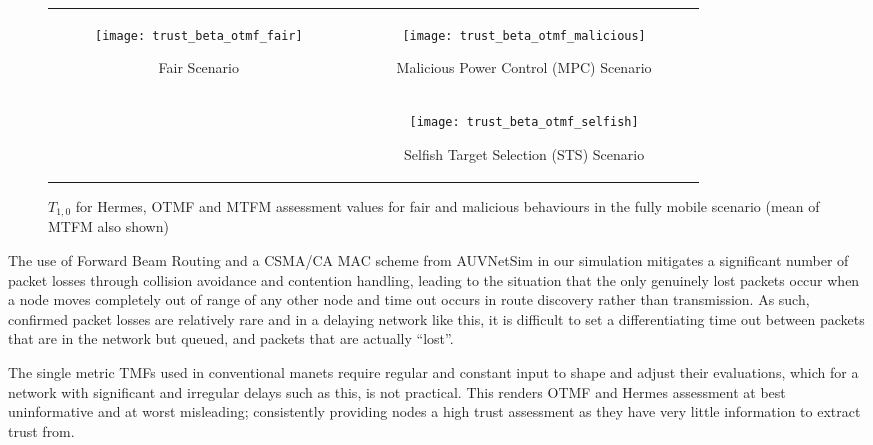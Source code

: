 \begin{figure*}[t]
  \centering
  \begin{tabular}{cc}
  \multirow{2}{*}{
  \begin{subfigure}{0.5\textwidth}	
    \texttt{[image: trust\_beta\_otmf\_fair]}
    \caption{Fair Scenario}
    \label{fig:all_mobile_fair_beta}
  \end{subfigure}
  }&
  \begin{subfigure}{0.5\textwidth}
    \texttt{[image: trust\_beta\_otmf\_malicious]} 
    \caption{Malicious Power Control (MPC) Scenario}
    \label{fig:all_mobile_badmouthing_beta}
  \end{subfigure} \\
  &
  \begin{subfigure}{0.5\textwidth}	
    \texttt{[image: trust\_beta\_otmf\_selfish]} 
    \caption{Selfish Target Selection (STS) Scenario}
    \label{fig:all_mobile_selfish_beta}
  \end{subfigure}
\end{tabular}
  \caption{$T_{1,0}$ for Hermes, OTMF and MTFM assessment values for fair and malicious behaviours in the fully mobile scenario (mean of MTFM also shown)}
  \label{fig:otmf_beta_comparison}
\end{figure*}
%
The use of Forward Beam Routing and a CSMA/CA MAC scheme from AUVNetSim \cite{Miquel2008} in our simulation mitigates a significant number of packet losses through collision avoidance and contention handling, leading to the situation that the only genuinely lost packets occur when a node moves completely out of range of any other node and time out occurs in route discovery rather than transmission.
As such, confirmed packet losses are relatively rare and in a delaying network like this, it is difficult to set a differentiating time out between packets that are in the network but queued, and packets that are actually ``lost''.

The single metric TMFs used in conventional \gls{manet}s require regular and constant input to shape and adjust their evaluations, which for a network with significant and irregular delays such as this, is not practical.
This renders OTMF and Hermes assessment at best uninformative and at worst misleading; consistently providing nodes a high trust assessment as they have very little information to extract trust from. 

